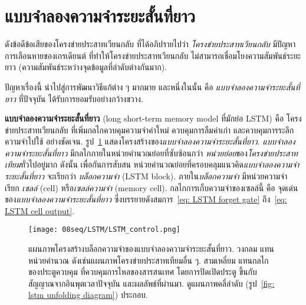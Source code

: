 \section{แบบจำลองความจำระยะสั้นที่ยาว}
\label{sec: RNN lstm}

ดังข้อดีข้อเสียของโครงข่ายประสาทเวียนกลับ
ที่ได้อภิปรายไปว่า
\textit{โครงข่ายประสาทเวียนกลับ}
มีปัญหาการเลือนหายของเกรเดียนต์
ที่ทำให้โครงข่ายประสาทเวียนกลับ
ไม่สามารถเชื่อมโยงความสัมพันธ์ระยะยาว (ความสัมพันธ์ระหว่างจุดข้อมูลที่ลำดับต่างกันมาก).

ปัญหาเรื่องนี้
นำไปสู่การพัฒนาวิธีแก้ต่าง ๆ มากมาย
และหนึ่งในนั้น
คือ
\textit{แบบจำลองความจำระยะสั้นที่ยาว}
ที่ปัจจุบัน ได้รับการยอมรับอย่างกว้างขวาง.

\textbf{แบบจำลองความจำระยะสั้นที่ยาว} 
(long short-term memory model\cite{HochreiterEtAl2001a, HochreiterSchmidhuber1997, GersEtAl1999, GersEtAl2002, GreffEtAl2017} ที่มักย่อ LSTM)
คือ 
โครงข่ายประสาทเวียนกลับ
ที่เพิ่มกลไกควบคุมความจำค่าใหม่ ควบคุมการลืมค่าเก่า และควบคุมการระลึกความจำไปใช้ อย่างชัดเจน.
รูป~\ref{fig: lstm block}
แสดงโครงสร้างของ\textit{แบบจำลองความจำระยะสั้นที่ยาว}.
\textit{แบบจำลองความจำระยะสั้นที่ยาว}
มีกลไกภายในหน่วยคำนวณย่อยที่ซับซ้อนกว่า
\textit{หน่วยย่อย}ของ\textit{โครงข่ายประสาทเทียม}ทั่วไปอยู่มาก
ดังนั้น เพื่อกันการสับสน
หน่วยคำนวณย่อยที่ครอบคลุมแนวคิด\textit{แบบจำลองความจำระยะสั้นที่ยาว}
จะเรียกว่า \textit{บล็อกความจำ} (LSTM block).
ภายใน\textit{บล็อกความจำ}
มีหน่วยความจำ เรียก 
\textit{เซลล์} (cell)
หรือ\textit{เซลล์ความจำ} (memory cell).
กลไกการเก็บความจำของเซลล์นี้ คือ จุดเด่นของ\textit{แบบจำลองความจำระยะสั้นที่ยาว}
ซึ่งบรรยายดังสมการ~\ref{eq: LSTM forget gate} ถึง~\ref{eq: LSTM cell output}.

\begin{figure}
	\begin{center}		
	\texttt{[image: 08seq/LSTM/LSTM\_control.png]}	
		\caption[แผนภาพโครงสร้างบล็อกความจำของแบบจำลองความจำระยะสั้นที่ยาว]{แผนภาพโครงสร้างบล็อกความจำของแบบจำลองความจำระยะสั้นที่ยาว.
		วงกลม แทนหน่วยคำนวณ ดังเช่นแผนภาพโครงข่ายประสาทเทียมอื่น ๆ.
		สามเหลี่ยม แทนกลไกของประตูควบคุม ที่ควบคุมการไหลของสารสนเทศ 
		โดยการปิดเปิดประตู ขึ้นกับสัญญาณจากอินพุตเวลาปัจจุบัน และผลลัพธ์ที่ผ่านมา.
		ดูแผนภาพคลี่ลำดับ (รูป~\ref{fig: lstm unfolding diagram}) ประกอบ.
		}
		\label{fig: lstm block}
	\end{center}
\end{figure}
%

